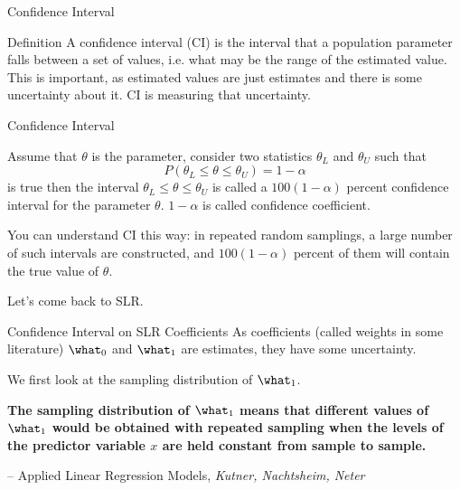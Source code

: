 \documentclass[aspectratio=169,xcolor=dvipsnames,svgnames,x11names,fleqn]{beamer}
\begin{document}
    
    \begin{frame}{Confidence Interval}
    \begin{tblock}{Definition}
    A confidence interval (CI) is the interval that a population parameter falls between a set of values, i.e. what may be the range of the estimated value. This is important, as estimated values are just estimates and there is some uncertainty about it. CI is measuring that uncertainty.
    \end{tblock}

\end{frame}
    
    
\begin{frame}{Confidence Interval}
    
    Assume that $\theta$ is the parameter, consider two statistics $\theta_L$ and $\theta_U$ such that
    \begin{equation}
        P(\theta_L \leq \theta \leq \theta_U) = 1-\alpha
    \end{equation}
    is true then the interval $\theta_L \leq \theta \leq \theta_U$ is called a $100(1-\alpha)$ percent confidence interval for the parameter $\theta$. $1 - \alpha$ is called confidence coefficient.
    
    You can understand CI this way:  in repeated random samplings, a large number of such intervals are constructed, and $100(1-\alpha)$ percent of them will contain
    the true value of $\theta$.
    \end{frame}
    

       \begin{frame}{}
        \Large
        \begin{center}
            Let's come back to SLR.
        \end{center}
                
        \end{frame}
    
\begin{frame}{Confidence Interval on SLR Coefficients}
    As coefficients (called weights in some literature) $\what_0$ and $\what_1$ are estimates, they have some uncertainty.
    
    We first look at the sampling distribution of $\what_1$.
    
    \begin{gradblock}{}
       \textbf{The sampling distribution of $\what_1$ means that different values of  $\what_1$ would be obtained
    with repeated sampling when the levels of the predictor variable $x$ are held constant from sample to sample.}
    
    \hfill -- Applied Linear Regression Models, \textit{Kutner, Nachtsheim, Neter}
    \end{gradblock}
    \end{frame}
    
\end{document}
